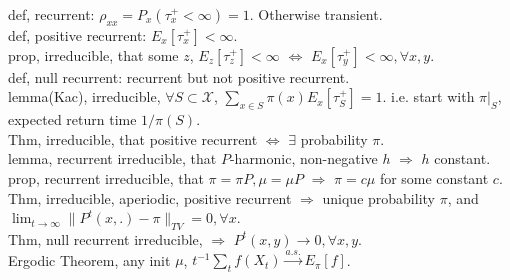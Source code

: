 \documentclass[paper=a4, fontsize=11pt]{scrartcl} %
\numberwithin{equation}{section} %
\numberwithin{figure}{section} %
\numberwithin{table}{section} %
\begin{document}
def, recurrent: $\rho_{xx}=P_x(\tau_x^+<\infty)=1$. Otherwise transient.\\
def, positive recurrent: $E_x[\tau_x^+]<\infty$.\\
prop, irreducible, that some $z$, $E_z[\tau_z^+]<\infty$ $\Leftrightarrow$ $E_x[\tau_y^+]<\infty, \forall x,y$.\\
def, null recurrent: recurrent but not positive recurrent.\\
lemma(Kac), irreducible, $\forall S\subset \mathcal{X}$, $\sum_{x\in S}\pi(x)E_x[\tau_S^+]=1$. i.e. start with $\pi|_S$, expected return time $1/\pi(S)$.\\
Thm, irreducible, that positive recurrent $\Leftrightarrow$ $\exists$ probability $\pi$.\\
lemma, recurrent irreducible, that $P$-harmonic, non-negative $h$ $\Rightarrow$ $h$ constant.\\
prop, recurrent irreducible, that $\pi=\pi P,\mu=\mu P$ $\Rightarrow$ $\pi=c\mu$ for some constant $c$.\\
Thm, irreducible, aperiodic, positive recurrent $\Rightarrow$ unique probability $\pi$, and $\lim_{t\rightarrow\infty}\|P^t(x,.)-\pi\|_{TV}=0,\forall x$.\\
Thm, null recurrent irreducible, $\Rightarrow$ $P^t(x,y)\rightarrow 0,\forall x,y$.\\
Ergodic Theorem, any init $\mu$, $t^{-1}\sum_t f(X_t)\stackrel{a.s.}{\rightarrow} E_\pi[f]$.
\end{document}
